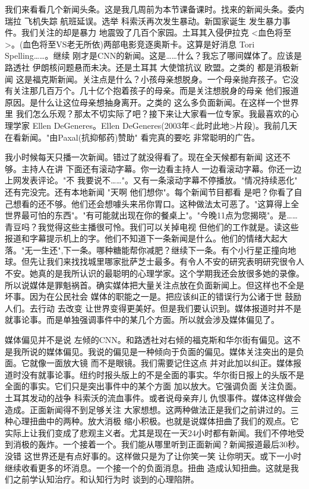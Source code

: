 我们来看看几个新闻头条。这是我几周前为本节课备课时。找来的新闻头条。委内瑞拉 飞机失踪 航班延误。选举 科索沃再次发生暴动。新国家诞生 发生暴力事件。我们关注的却是暴力 地震毁了几百个家园。土耳其入侵伊拉克 <血色将至>。(血色将至VS老无所依)两部电影竞逐奥斯卡。这算是好消息 Tori Spelling……。继续 刚才是CNN的新闻。这是……什么？我忘了哪间媒体了。应该是路透社 伊朗核问题悬而未决。还是土耳其 大使馆抗议 欧盟。之类的 都是消极新闻 这是福克斯新闻。关注点是什么？小孩母亲想脱身。一个母亲抛弃孩子。它没有关注那几百万个。几十亿个抱着孩子的母亲。而是关注想脱身的母亲 他们报道原因。是什么让这位母亲想抽身离开。之类的 这么多负面新闻。在这样一个世界里 我们怎么乐观？那太不切实际了吧？接下来让大家看一位专家。我最喜欢的心理学家 Ellen DeGeneres。Ellen DeGeneres(2003年<此时此地>片段)。我前几天在看新闻。"由Paxal(抗抑郁药)赞助" 看完真的要吃 非常聪明的广告。 

我小时候每天只播一次新闻。错过了就没得看了。现在全天候都有新闻 这还不够。主持人在讲 下面还有滚动字幕。你一边看主持人 一边看滚动字幕。你还一边上网发表评论。"不 我要说不……"。又有一条滚动字幕不停播放。"情况持续恶化" 还有完没完。还有本地新闻 "天啊 他们想你"。每个新闻节目都看 是吧？你看了自己想看的还不够。他们还会想噱头来吊你胃口。这种做法太可恶了。"这算得上全世界最可怕的东西"。"有可能就出现在你的餐桌上"。"今晚11点为您揭晓"。是……青豆吗？我觉得这些主播很可怜。我们可以关掉电视 但他们的工作就是。读这些报道和字幕提示机上的字。他们不知道下一条新闻是什么。他们的情绪大起大落。"无一生还",下一条。哪种糖能帮你减肥？继续下一条。有个小行星正撞向地球。但先让我们来找找城里哪家批萨芝士最多。有令人不安的研究表明研究很令人不安。她真的是我所认识的最聪明的心理学家。这个学期我还会放很多她的录像。所以说媒体是罪魁祸首。确实媒体把大量关注点放在负面新闻上。但这样也不全是坏事。因为在公民社会 媒体的职能之一是。把应该纠正的错误行为公诸于世 鼓励人们。去行动 去改变 让世界变得更美好。但是我们要认识到。媒体报道时并不是就事论事。而是单独强调事件中的某几个方面。所以就会涉及媒体偏见了。 

媒体偏见并不是说 左倾的CNN。和路透社对右倾的福克斯和华尔街有偏见。这不是我所说的媒体偏见。我说的偏见是一种倾向于负面的偏见。媒体关注突出的是负面。它就像一面放大镜 而不是眼镜。我们需要记住这点 并对此加以纠正。媒体报道时没有就事论事。纽约时报头版上的不是全面的事实。华尔街日报上的头版不是全面的事实。它们只是突出事件中的某个方面 加以放大。它强调负面 关注负面。土耳其发动的战争 科索沃的流血事件。或者说母亲弃儿 仇恨事件。媒体这样做会造成。正面新闻得不到足够关注 大家想想。这两种做法正是我们之前讲过的。三种心理扭曲中的两种。放大消极 缩小积极。也就是说媒体扭曲了我们的观点。它实际上让我们变成了悲观主义者。尤其是现在一天24小时都有新闻。我们不停地受到消极的轰炸。一个接着一个。我们能从哪里听到正面新闻？新闻报道最后30秒。没错 这世界还是有点好事的。这样做只是为了让你笑一笑 让你明天。或下一小时 继续收看更多的坏消息。一个接一个的负面消息。扭曲 造成认知扭曲。这就是我们之前学认知治疗。和认知行为时 谈到的心理陷阱。 

